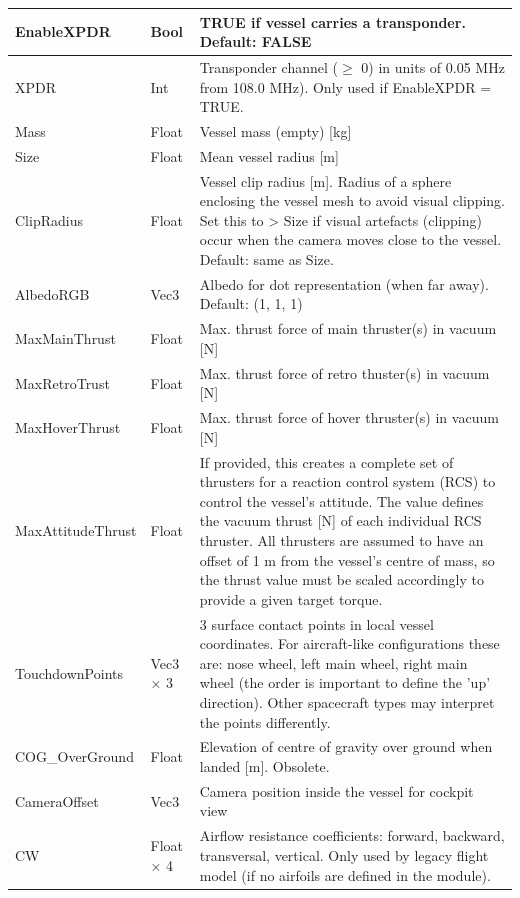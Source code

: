 \documentclass[Orbiter Developer Manual.tex]{subfiles}
\begin{document}
\begin{longtable}{ |p{}|p{}|p{}| }
	\hline\rule{0pt}{2ex}
	EnableXPDR & Bool & TRUE if vessel carries a transponder. Default: FALSE\\
	\hline\rule{0pt}{2ex}
	XPDR & Int & Transponder channel ($\geq$ 0) in units of 0.05 MHz from 108.0 MHz). Only used if EnableXPDR = TRUE.\\
	\hline\rule{0pt}{2ex}
	Mass & Float & Vessel mass (empty) [kg]\\
	\hline\rule{0pt}{2ex}
	Size & Float & Mean vessel radius [m]\\
	\hline\rule{0pt}{2ex}
	ClipRadius & Float & Vessel clip radius [m]. Radius of a sphere enclosing the vessel mesh to avoid visual clipping. Set this to > Size if visual artefacts (clipping) occur when the camera moves close to the vessel. Default: same as Size.\\
	\hline\rule{0pt}{2ex}
	AlbedoRGB & Vec3 & Albedo for dot representation (when far away). Default: (1, 1, 1)\\
	\hline\rule{0pt}{2ex}
	MaxMainThrust & Float & Max. thrust force of main thruster(s) in vacuum [N]\\
	\hline\rule{0pt}{2ex}
	MaxRetroTrust & Float & Max. thrust force of retro thuster(s) in vacuum [N]\\
	\hline\rule{0pt}{2ex}
	MaxHoverThrust & Float & Max. thrust force of hover thruster(s) in vacuum [N]\\
	\hline\rule{0pt}{2ex}
	MaxAttitudeThrust & Float & If provided, this creates a complete set of thrusters for a reaction control system (RCS) to control the vessel's attitude. The value defines the vacuum thrust [N] of each individual RCS thruster. All thrusters are assumed to have an offset of 1 m from the vessel's centre of mass, so the thrust value must be scaled accordingly to provide a given target torque.\\
	\hline\rule{0pt}{2ex}
	TouchdownPoints & Vec3 × 3 & 3 surface contact points in local vessel coordinates. For aircraft-like configurations these are: nose wheel, left main wheel, right main wheel (the order is important to define the 'up' direction). Other spacecraft types may interpret the points differently.\\
	\hline\rule{0pt}{2ex}
	COG\_OverGround & Float & Elevation of centre of gravity over ground when landed [m]. Obsolete.\\
	\hline\rule{0pt}{2ex}
	CameraOffset & Vec3 & Camera position inside the vessel for cockpit view\\
	\hline\rule{0pt}{2ex}
	CW & Float × 4 & Airflow resistance coefficients: forward, backward, transversal, vertical. Only used by legacy flight model (if no airfoils are defined in the module).\\

\end{longtable}
\end{document}
